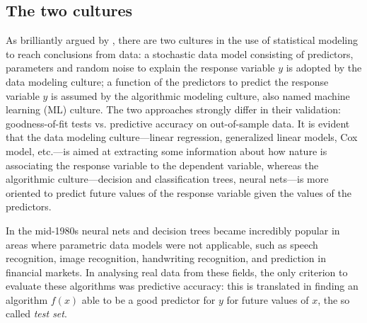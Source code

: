 \documentclass{statsoc}
\begin{document}
%

\color{black}


\subsection{The two cultures}

As brilliantly argued by \cite{breiman2001statistical}, there are two cultures in the use of statistical modeling to reach conclusions from data: a stochastic data model consisting 
of predictors, parameters and random noise to explain the response variable $y$ is adopted by the data modeling culture; a function of the predictors to predict the response variable 
$y$ is assumed by the algorithmic modeling culture, also named machine learning (ML) culture. The two approaches strongly differ in their validation: goodness-of-fit tests vs. 
predictive accuracy on out-of-sample data.  It is evident that the data modeling culture---linear regression, generalized linear models, Cox model, etc.---is aimed at extracting some information about how nature is associating the response variable to the dependent variable, whereas the algorithmic culture---decision and classification trees, neural nets---is more oriented to predict future values of the response variable given the values of the predictors.

In the mid-1980s neural nets and decision trees became incredibly popular \citep{breiman1984classification} in areas where parametric data models were not applicable, such as 
speech recognition, image recognition, handwriting recognition, and prediction in financial markets. In analysing real data from these fields, the only criterion to evaluate these 
algorithms was predictive accuracy: this is translated in finding an algorithm $f(x)$ able to be a good predictor for $y$ for future values of $x$, the so called \emph{test set}. 

\end{document}
